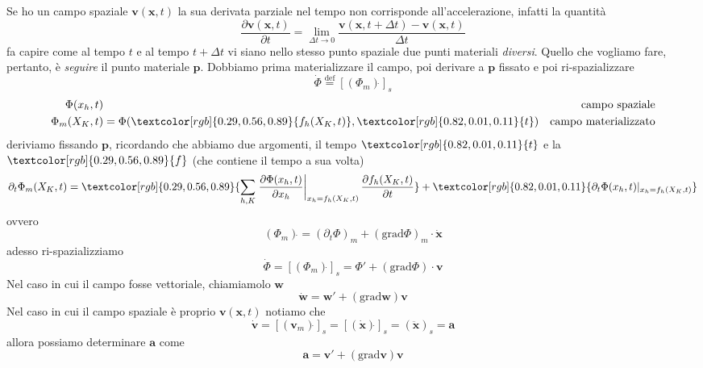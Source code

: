 \documentclass[10pt,a4paper,twoside]{book}
\begin{document}
Se ho un campo spaziale $\mathbf{v}(\mathbf{x} ,t)$ la sua derivata parziale nel tempo non corrisponde all'accelerazione, infatti la quantità
\begin{equation*}
\frac{\partial \mathbf{v}(\mathbf{x} ,t)}{\partial t} =\lim\limits _{\Delta t\rightarrow 0}\frac{\mathbf{v}(\mathbf{x} ,t+\Delta t) -\mathbf{v}(\mathbf{x} ,t)}{\Delta t}
\end{equation*}
fa capire come al tempo $t$ e al tempo $t+\Delta t$ vi siano nello stesso punto spaziale due punti materiali \textit{diversi}. Quello che vogliamo fare, pertanto, è \textit{seguire} il punto materiale $\mathbf{p}$. Dobbiamo prima materializzare il campo, poi derivare a $\mathbf{p}$ fissato e poi ri-spazializzare
\begin{equation*}
\boxed{\dot{\Phi }\overset{\text{def}}{=}\left[( \Phi _{m})\dot{}\right]_{s}}
\end{equation*}
\begin{equation*}
\begin{aligned}
\Phi ( x_{h} ,t) & \  & \text{campo spaziale}\\
\Phi _{m}( X_{K} ,t) & =\Phi (\textcolor[rgb]{0.29,0.56,0.89}{f_{h}(X_{K},t)} ,\textcolor[rgb]{0.82,0.01,0.11}{t}) & \text{campo materializzato}
\end{aligned}
\end{equation*}
deriviamo fissando $\mathbf{p}$, ricordando che abbiamo due argomenti, il tempo $\textcolor[rgb]{0.82,0.01,0.11}{t}$ e la $\textcolor[rgb]{0.29,0.56,0.89}{f}$ (che contiene il tempo a sua volta)
\begin{equation*}
\partial _{t} \Phi _{m}( X_{K} ,t) =\textcolor[rgb]{0.29,0.56,0.89}{\sum _{h,K}\left. \frac{\partial \Phi ( x_{h} ,t)}{\partial x_{h}}\right| _{x_{h} =f_{h}( X_{K} ,t)}\frac{\partial f_{h}( X_{K} ,t)}{\partial t}} +\textcolor[rgb]{0.82,0.01,0.11}{\partial _{t}\Phi (x_{h},t)|_{x_{h} =f_{h}( X_{K} ,t)}}
\end{equation*}
ovvero
\begin{equation*}
( \Phi _{m})\dot{} =( \partial _{t} \Phi )_{m} +(\mathrm{grad} \Phi )_{m} \cdotp \dot{\mathbf{x}}
\end{equation*}
adesso ri-spazializziamo
\begin{equation*}
\boxed{\dot{\Phi } =\left[( \Phi _{m})\dot{}\right]_{s} =\Phi '+(\mathrm{grad} \Phi ) \cdotp \mathbf{v}}
\end{equation*}
Nel caso in cui il campo fosse vettoriale, chiamiamolo $\mathbf{w}$
\begin{equation*}
\boxed{\dot{\mathbf{w}} =\mathbf{w} '+(\mathrm{grad}\mathbf{w})\mathbf{v}}
\end{equation*}
Nel caso in cui il campo spaziale è proprio $\mathbf{v}(\mathbf{x} ,t)$ notiamo che
\begin{equation*}
\dot{\mathbf{v}} =\left[(\mathbf{v}_{m})\dot{}\right]_{s} =\left[(\dot{\mathbf{x}})\dot{}\right]_{s} =(\ddot{\mathbf{x}})_{s} =\mathbf{a}
\end{equation*}
allora possiamo determinare $\mathbf{a}$ come
\begin{equation*}
\boxed{\mathbf{a} =\mathbf{v} '+(\mathrm{grad}\mathbf{v})\mathbf{v}}
\end{equation*}
\end{document}
